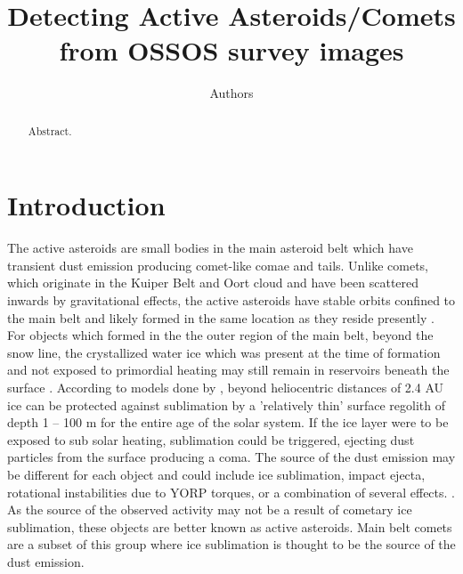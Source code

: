 \documentclass[iop,apj]{emulateapj}
\begin{document}
\title{Detecting Active Asteroids/Comets from OSSOS survey images}
\author{Authors}

\begin{abstract}
Abstract.
\end{abstract}

\maketitle

\section{Introduction}

The active asteroids are small bodies in the main asteroid belt which have transient dust emission producing comet-like comae and tails. Unlike comets, which originate in the Kuiper Belt and Oort cloud and have been scattered inwards by gravitational effects, the active asteroids have  stable orbits confined to the main belt and likely formed in the same location as they reside presently \citep{sheppard14}. For objects which formed in the the outer region of the main belt, beyond the snow line, the crystallized water ice which was present at the time of formation and not exposed to primordial heating may still remain in reservoirs beneath the surface \citep{sonnett11}.  According to models done by \citet*{fanale89},  beyond heliocentric distances of 2.4 AU ice can be protected against sublimation by a 'relatively thin' surface regolith  of depth 1 -- 100 m for the entire age of the solar system. If the ice layer were to be exposed to sub solar heating,  sublimation could be triggered,  ejecting dust particles from the surface producing a coma.  %
The source of the dust emission may be different for each object and could include ice sublimation, impact ejecta, rotational instabilities due to YORP torques, or a combination of several effects. \citep{hsieh15}. %
As the source of the observed activity may not be a result of cometary ice sublimation, these objects are better known as active asteroids. Main belt comets are a subset of this group where ice sublimation is thought to be the source of the dust emission. 
\end{document}
